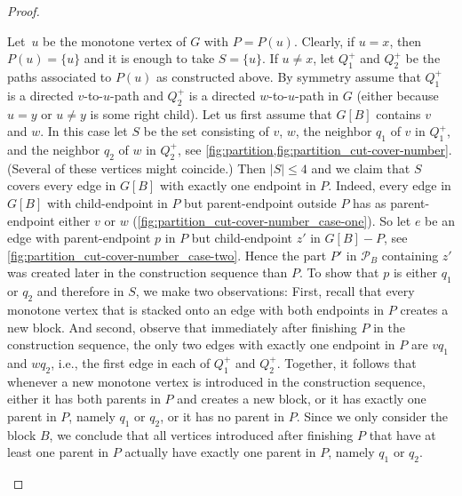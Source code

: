 \documentclass{theoretics}
\newcommand{\calP}{\ensuremath{\mathcal{P}}\xspace}
\begin{document}
\begin{proof}
\begin{subproof}
    Let~$u$ be the monotone vertex of $G$ with $P = P(u)$.
    Clearly, if $u=x$, then $P(u) = \{u\}$ and it is enough to take $S = \{u\}$.
    If $u \neq x$, let $Q_1^+$ and $Q_2^+$ be the paths associated to $P(u)$ as constructed above.
    By symmetry assume that $Q_1^+$ is a directed $v$-to-$u$-path and $Q_2^+$ is a directed $w$-to-$u$-path in $G$ (either because $u=y$ or $u \neq y$ is some right child).
    Let us first assume that $G[B]$ contains $v$ and $w$.
    In this case let $S$ be the set consisting of $v$, $w$, the neighbor $ q_1 $ of $v$ in $Q_1^+$, and the neighbor $ q_2 $ of $w$ in $Q_2^+$, see \cref{fig:partition,fig:partition_cut-cover-number}.
    (Several of these vertices might coincide.)
    Then $|S| \leq 4$ and we claim that $S$ covers every edge in $G[B]$ with exactly one endpoint in $P$.
    Indeed, every edge in $G[B]$ with child-endpoint in $P$ but parent-endpoint outside $ P $ has as parent-endpoint either $v$ or $w$ (\cref{fig:partition_cut-cover-number_case-one}).
    So let $e$ be an edge with parent-endpoint $ p $ in $P$ but child-endpoint $z'$ in $G[B] - P$, see \cref{fig:partition_cut-cover-number_case-two}.
    Hence the part $P'$ in $\calP_B$ containing $z'$ was created later in the construction sequence than $P$.
    To show that $ p $ is either $ q_1 $ or $ q_2 $ and therefore in $ S $, we make two observations:
    First, recall that every monotone vertex that is stacked onto an edge with both endpoints in $ P $ creates a new block.
    And second, observe that immediately after finishing $ P $ in the construction sequence, the only two edges with exactly one endpoint in $ P $ are $ v q_1 $ and $ w q_2 $, i.e., the first edge in each of $ Q_1^+ $ and $ Q_2^+ $.
    Together, it follows that whenever a new monotone vertex is introduced in the construction sequence, either it has both parents in $ P $ and creates a new block, or it has exactly one parent in $ P $, namely $ q_1 $ or $ q_2 $, or it has no parent in $ P $.
    Since we only consider the block $ B $, we conclude that all vertices introduced after finishing $ P $ that have at least one parent in $ P $ actually have exactly one parent in $ P $, namely $ q_1 $ or $ q_2 $.


\end{subproof}
\end{proof}
\end{document}
